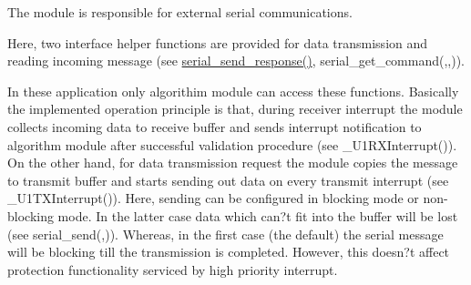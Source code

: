 The module is responsible for external serial communications.

Here, two interface helper functions are provided for data transmission and reading incoming message (see \hyperlink{a00030_a96a3f016ca5b0736424c2695fe9fbdf8}{serial\+\_\+send\+\_\+response()}, serial\+\_\+get\+\_\+command(,,)).

In these application only algorithim module can access these functions. Basically the implemented operation principle is that, during receiver interrupt the module collects incoming data to receive buffer and sends interrupt notification to algorithm module after successful validation procedure (see \+\_\+\+U1\+R\+X\+Interrupt()). On the other hand, for data transmission request the module copies the message to transmit buffer and starts sending out data on every transmit interrupt (see \+\_\+\+U1\+T\+X\+Interrupt()). Here, sending can be configured in blocking mode or non-\/blocking mode. In the latter case data which can?t fit into the buffer will be lost (see serial\+\_\+send(,)). Whereas, in the first case (the default) the serial message will be blocking till the transmission is completed. However, this doesn?t affect protection functionality serviced by high priority interrupt. 